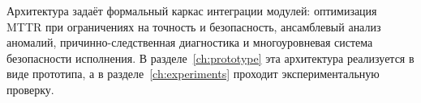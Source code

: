 \medskip

Архитектура задаёт формальный каркас интеграции модулей: оптимизация MTTR при ограничениях на точность и безопасность, ансамблевый анализ аномалий, причинно-следственная диагностика и многоуровневая система безопасности исполнения. В разделе~\ref{ch:prototype} эта архитектура реализуется в виде прототипа, а в разделе~\ref{ch:experiments} проходит экспериментальную проверку.
